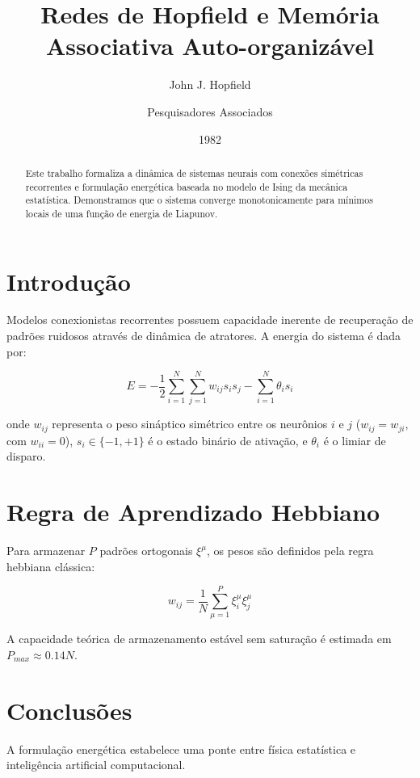 \documentclass[11pt,a4paper]{article}
\title{Redes de Hopfield e Memória Associativa Auto-organizável}
\author{John J. Hopfield \and Pesquisadores Associados}
\date{1982}
\begin{document}
\maketitle

\begin{abstract}
Este trabalho formaliza a dinâmica de sistemas neurais com conexões simétricas recorrentes e formulação energética baseada no modelo de Ising da mecânica estatística. Demonstramos que o sistema converge monotonicamente para mínimos locais de uma função de energia de Liapunov.
\end{abstract}

\section{Introdução}
Modelos conexionistas recorrentes possuem capacidade inerente de recuperação de padrões ruidosos através de dinâmica de atratores. A energia do sistema é dada por:

\begin{equation}
E = -\frac{1}{2} \sum_{i=1}^{N} \sum_{j=1}^{N} w_{ij} s_i s_j - \sum_{i=1}^{N} \theta_i s_i
\end{equation}

onde $w_{ij}$ representa o peso sináptico simétrico entre os neurônios $i$ e $j$ ($w_{ij} = w_{ji}$, com $w_{ii} = 0$), $s_i \in \{-1, +1\}$ é o estado binário de ativação, e $\theta_i$ é o limiar de disparo.

\section{Regra de Aprendizado Hebbiano}
Para armazenar $P$ padrões ortogonais $\xi^{\mu}$, os pesos são definidos pela regra hebbiana clássica:

\begin{equation}
w_{ij} = \frac{1}{N} \sum_{\mu=1}^{P} \xi_i^{\mu} \xi_j^{\mu}
\end{equation}

A capacidade teórica de armazenamento estável sem saturação é estimada em $P_{max} \approx 0.14 N$.

\section{Conclusões}
A formulação energética estabelece uma ponte entre física estatística e inteligência artificial computacional.
\end{document}
